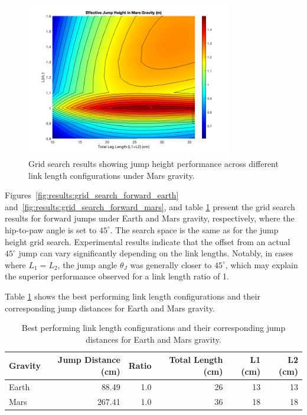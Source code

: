 \begin{figure}[H]
    \centering
    \includegraphics[width=0.8\textwidth]{Images/results/grid_search_mars.png}
    \caption{Grid search results showing jump height performance across different link length configurations under Mars gravity.}
    \label{fig:results:grid_search_mars}
\end{figure}


Figures~\ref{fig:results:grid_search_forward_earth} and~\ref{fig:results:grid_search_forward_mars}, and table \ref{tab:results:grid_search:best_jumps_forward} present the grid search results for forward jumps under Earth and Mars gravity, respectively, where the hip-to-paw angle is set to \(45^{\circ}\). The search space is the same as for the jump height grid search. Experimental results indicate that the offset from an actual \(45^{\circ}\) jump can vary significantly depending on the link lengths. Notably, in cases where \(L_1 = L_2\), the jump angle \(\theta_J\) was generally closer to \(45^{\circ}\), which may explain the superior performance observed for a link length ratio of 1.

Table \ref{tab:results:grid_search:best_jumps_forward} shows the best performing link length configurations and their corresponding jump distances for Earth and Mars gravity.

\begin{table}[h]
    \centering
    \begin{tabular}{lrrrrr}
        \hline
        Gravity & Jump Distance (cm) & Ratio & Total Length (cm) & L1 (cm) & L2 (cm) \\
        \hline
        Earth & 88.49 & 1.0 & 26 & 13 & 13 \\
        Mars & 267.41 & 1.0 & 36 & 18 & 18 \\
        \hline
\end{tabular}
\caption{Best performing link length configurations and their corresponding jump distances for Earth and Mars gravity.}
\label{tab:results:grid_search:best_jumps_forward}
\end{table}

